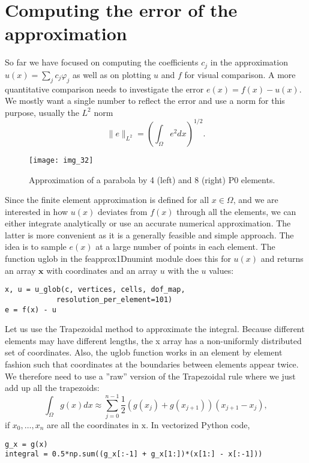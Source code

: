 \documentclass[../main.tex]{subfiles}
\begin{document}
\section[Computing the error of the approximation]{Computing the error of the approximation}
\label{sec:sec_6_4}
So far we have focused on computing the coefficients $c_{j}$ in the approximation $u(x)=\sum_{j} c_{j} \varphi_{j}$ as well as on plotting $u$ and $f$ for visual comparison. A more quantitative comparison needs to investigate the error $e(x)=f(x)-u(x)$. We mostly want a single number to reflect the error and use a norm for this purpose, usually the $L^{2}$ norm
$$
\|e\|_{L^{2}}=\left(\int_{\Omega} e^{2} d x\right)^{1 / 2}.
$$
\begin{figure}[H]
	\centering
	\texttt{[image: img\_32]}
	\caption{Approximation of a parabola by 4 (left) and 8 (right) P0 elements.}
	\label{fig:img_32}
\end{figure}
\noindent Since the finite element approximation is defined for all $x \in \Omega$, and we are interested in how $u(x)$ deviates from $f(x)$ through all the elements, we can either integrate analytically or use an accurate numerical approximation. The latter is more convenient as it is a generally feasible and simple approach. The idea is to sample $e(x)$ at a large number of points in each element. The function u\textunderscore glob in the fe\textunderscore approx1D\textunderscore numint module does this for $u(x)$ and returns an array $\mathbf{x}$ with coordinates and an array $u$ with the $u$ values:
\begin{lstlisting}[numbers=none]
x, u = u_glob(c, vertices, cells, dof_map,
			resolution_per_element=101)
e = f(x) - u
\end{lstlisting}
Let us use the Trapezoidal method to approximate the integral. Because different
elements may have different lengths, the x array has a non-uniformly distributed
set of coordinates. Also, the u\textunderscore glob function works in an element by element
fashion such that coordinates at the boundaries between elements appear twice.
We therefore need to use a ”raw” version of the Trapezoidal rule where we just
add up all the trapezoids:
$$
\int_{\Omega} g(x) d x \approx \sum_{j=0}^{n-1} \frac{1}{2}\left(g\left(x_{j}\right)+g\left(x_{j+1}\right)\right)\left(x_{j+1}-x_{j}\right),
$$
if $x_{0}, \ldots, x_{n}$ are all the coordinates in $\mathrm{x}$. In vectorized Python code,
\begin{lstlisting}[numbers=none]
g_x = g(x)
integral = 0.5*np.sum((g_x[:-1] + g_x[1:])*(x[1:] - x[:-1]))	
\end{lstlisting}
\end{document}
